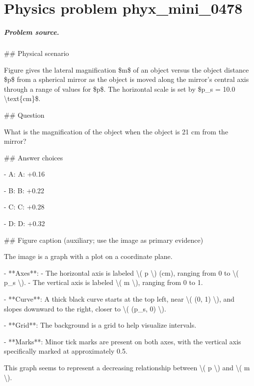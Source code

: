
\chapter{Physics problem phyx\_mini\_0478}
\label{ch:PhyXMiniProblems_problem_phyx_mini_0478}

\paragraph{Problem source.}
\#\# Physical scenario

Figure gives the lateral magnification \$m\$ of an object versus the object distance \$p\$ from a spherical mirror as the object is moved along the mirror’s central axis through a range of values for \$p\$. The horizontal scale is set by \$p\_s = 10.0 \textbackslash{}text\{cm\}\$.

\#\# Question

What is the magnification of the object when the object is 21 cm from the mirror?

\#\# Answer choices

- A: A: +0.16

- B: B: +0.22

- C: C: +0.28

- D: D: +0.32

\#\# Figure caption (auxiliary; use the image as primary evidence)

The image is a graph with a plot on a coordinate plane. 

- **Axes**: 
  - The horizontal axis is labeled \textbackslash{}( p \textbackslash{}) (cm), ranging from 0 to \textbackslash{}( p\_s \textbackslash{}).
  - The vertical axis is labeled \textbackslash{}( m \textbackslash{}), ranging from 0 to 1.

- **Curve**: A thick black curve starts at the top left, near \textbackslash{}( (0, 1) \textbackslash{}), and slopes downward to the right, closer to \textbackslash{}( (p\_s, 0) \textbackslash{}).

- **Grid**: The background is a grid to help visualize intervals.

- **Marks**: Minor tick marks are present on both axes, with the vertical axis specifically marked at approximately 0.5.

This graph seems to represent a decreasing relationship between \textbackslash{}( p \textbackslash{}) and \textbackslash{}( m \textbackslash{}).

